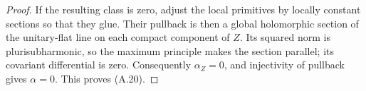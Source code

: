 \begin{proof}
If the resulting class is zero, adjust the local primitives by locally constant sections so that they glue. Their pullback is then a global holomorphic section of the unitary-flat line on each compact component of $Z$. Its squared norm is plurisubharmonic, so the maximum principle makes the section parallel; its covariant differential is zero. Consequently $\alpha_Z=0$, and injectivity of pullback gives $\alpha=0$. This proves (A.20).
\end{proof}



